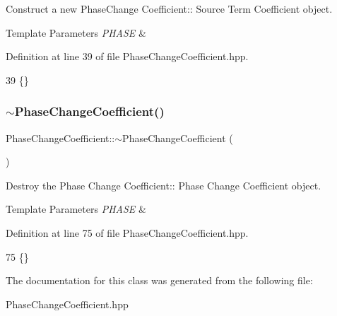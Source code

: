Construct a new Phase\+Change Coefficient\+:\+: Source Term Coefficient object. 


\begin{DoxyTemplParams}{Template Parameters}
{\em P\+H\+A\+SE} & \\
\hline
\end{DoxyTemplParams}


Definition at line 39 of file Phase\+Change\+Coefficient.\+hpp.


\begin{DoxyCode}
39 \{\}
\end{DoxyCode}
\mbox{\label{classPhaseChangeCoefficient_a3e28051637e778e8dc2b6d1a907b59ea}} 
\subsubsection{\texorpdfstring{$\sim$\+Phase\+Change\+Coefficient()}{~PhaseChangeCoefficient()}}
{\footnotesize\ttfamily Phase\+Change\+Coefficient\+::$\sim$\+Phase\+Change\+Coefficient (\begin{DoxyParamCaption}{ }\end{DoxyParamCaption})}



Destroy the Phase Change Coefficient\+:\+: Phase Change Coefficient object. 


\begin{DoxyTemplParams}{Template Parameters}
{\em P\+H\+A\+SE} & \\
\hline
\end{DoxyTemplParams}


Definition at line 75 of file Phase\+Change\+Coefficient.\+hpp.


\begin{DoxyCode}
75 \{\}
\end{DoxyCode}


The documentation for this class was generated from the following file\+:\begin{DoxyCompactItemize}
\item 
Phase\+Change\+Coefficient.\+hpp\end{DoxyCompactItemize}
